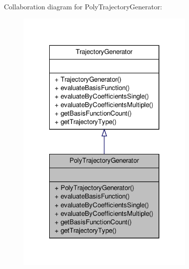 \-Collaboration diagram for \-Poly\-Trajectory\-Generator\-:\nopagebreak
\begin{figure}[H]
\begin{center}
\leavevmode
\includegraphics[width=246pt]{classPolyTrajectoryGenerator__coll__graph}
\end{center}
\end{figure}
